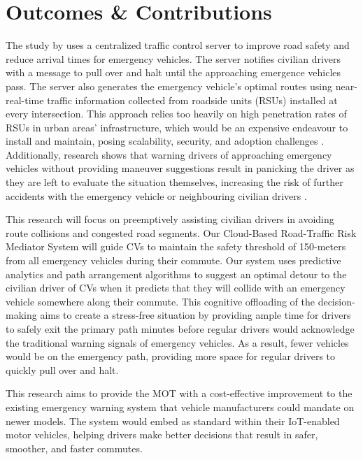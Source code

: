 \section{Outcomes \& Contributions}
The study by \cite{Huang2009} uses a centralized traffic control server to improve road safety and reduce arrival times for emergency vehicles. The server notifies civilian drivers with a message to pull over and halt until the approaching emergence vehicles pass. The server also generates the emergency vehicle's optimal routes using near-real-time traffic information collected from roadside units (RSUs) installed at every intersection. This approach relies too heavily on high penetration rates of RSUs in urban areas' infrastructure, which would be an expensive endeavour to install and maintain, posing scalability, security, and adoption challenges \cite{Tonguz2020}. Additionally, research shows that warning drivers of approaching emergency vehicles without providing maneuver suggestions result in panicking the driver as they are left to evaluate the situation themselves, increasing the risk of further accidents with the emergency vehicle or neighbouring civilian drivers \cite{Buchenscheit2009, Sukru2020}.

This research will focus on preemptively assisting civilian drivers in avoiding route collisions and congested road segments. Our Cloud-Based Road-Traffic Risk Mediator System will guide CVs to maintain the safety threshold of 150-meters \cite{MoveOver_2021, MTO_2020} from all emergency vehicles during their commute. Our system uses predictive analytics and path arrangement algorithms to suggest an optimal detour to the civilian driver of CVs when it predicts that they will collide with an emergency vehicle somewhere along their commute. This cognitive offloading of the decision-making aims to create a stress-free situation by providing ample time for drivers to safely exit the primary path minutes before regular drivers would acknowledge the traditional warning signals of emergency vehicles. As a result, fewer vehicles would be on the emergency path, providing more space for regular drivers to quickly pull over and halt. 

This research aims to provide the MOT with a cost-effective improvement to the existing emergency warning system that vehicle manufacturers could mandate on newer models. The system would embed as standard within their IoT-enabled motor vehicles, helping drivers make better decisions that result in safer, smoother, and faster commutes.


